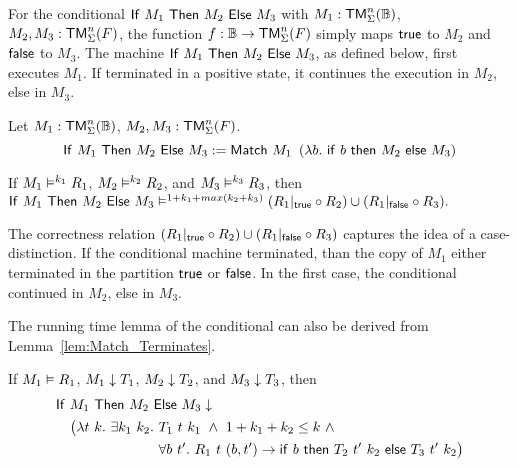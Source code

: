 For the conditional $\mathsf{If}~M_1~\mathsf{Then}~M_2~\mathsf{Else}~M_3$ with $M_1 : \mathsf{TM}_\Sigma^n(\mathbb{B})$, $M_2, M_3 : \mathsf{TM}_\Sigma^n(F)$, the function $f : \mathbb{B} \rightarrow \mathsf{TM}_\Sigma^n(F)$
simply maps $\mathsf{true}$ to $M_2$ and $\mathsf{false}$ to $M_3$.  The machine $\mathsf{If}~M_1~\mathsf{Then}~M_2~\mathsf{Else}~M_3$, as defined below, first executes $M_1$.  If terminated in a
positive state, it continues the execution in $M_2$, else in $M_3$.

%
\begin{definition}[Conditional][If]
  \label{def:If}
  Let $M_1 : \mathsf{TM}_\Sigma^n(\mathbb{B})$, $M_2, M_3 : \mathsf{TM}_\Sigma^n(F)$.
  \[
    \mathsf{If}~M_1~\mathsf{Then}~M_2~\mathsf{Else}~M_3 := \mathsf{Match}~M_1~
    \left(\lambda b.~\mathsf{if}~b~\mathsf{then}~M_2~\mathsf{else}~M_3 \right)
  \]
\end{definition}

\begin{lemma}
  \label{lem:If_RealiseIn}
  If $M_1 \mathrel{\vDash^{k_1}} R_1$, $M_2 \mathrel{\vDash^{k_2}} R_2$, and $M_3 \mathrel{\vDash^{k_3}} R_3$, then
  $
    \mathsf{If}~M_1~\mathsf{Then}~M_2~\mathsf{Else}~M_3 \mathrel{\vDash^{1+k_1+max(k_2+k_3)}} (R_1{|}_{\mathsf{true}} \circ R_2) \cup (R_1{|}_{\mathsf{false}} \circ R_3).
  $
\end{lemma}

The correctness relation $(R_1{|}_{\mathsf{true}} \circ R_2) \cup (R_1{|}_{\mathsf{false}} \circ R_3)$ captures the idea of a case-distinction.  If the conditional machine
terminated, than the copy of $M_1$ either terminated in the partition $\mathsf{true}$ or $\mathsf{false}$.  In the first case, the conditional continued in $M_2$,
else in $M_3$.

The running time lemma of the conditional can also be derived from Lemma~\ref{lem:Match_Terminates}.
\begin{lemma}
  \label{lem:If_TerminatesIn}
  If $M_1 \mathrel{\vDash} R_1$, $M_1 \mathrel{\downarrow} T_1$, $M_2 \mathrel{\downarrow} T_2$, and $M_3 \mathrel{\downarrow} T_3$, then
  \begin{align*}
    & \mathsf{If}~M_1~\mathsf{Then}~M_2~\mathsf{Else}~M_3 \mathrel{\downarrow} \\
    &\quad \bigl( \lambda t~k.~\exists k_1~k_2.~T_1~t~k_1 ~\land~ 1+k_1+k_2 \leq k ~\land~ \\
    &\quad \phantom{\bigl( \lambda t~k.~\exists k_1~k_2.}~\forall b~t'.~R_1~t~(b, t') \rightarrow \mathsf{if}~b~\mathsf{then}~T_2~t'~k_2~\mathsf{else}~T_3~t'~k_2 \bigr)
  \end{align*}
\end{lemma}


